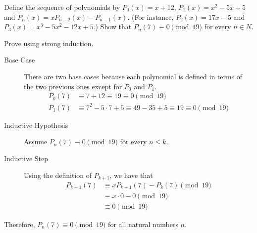 \question Define the sequence of polynomials by $P_0(x) = x + 12$, 
$P_1(x) = x^2 - 5x + 5$ and $P_n(x) = xP_{n-2}(x) - P_{n-1}(x)$. 
(For instance, $P_2(x) = 17x-5$ and $P_3(x) = x^3 -5x^2 -12x+5$.) 
Show that $P_n(7) \equiv 0 \pmod{19}$ for every $n \in N$. 
\begin{solution}[.8in]

\item Prove using strong induction.
\begin{description}
\item[Base Case] There are two base cases because each polynomial is 
defined in terms of the two previous ones except for $P_0$ and $P_1$.
\begin{equation}
\begin{split}
P_0(7) &\equiv 7 + 12 \equiv 19 \equiv 0 \pmod{19} \\ \nonumber
P_1(7) &\equiv 7^2 - 5\cdot 7 + 5 \equiv 49 - 35 + 5 \equiv 19 \equiv 
0 \pmod{19}
\end{split}
\end{equation}
\item[Inductive Hypothesis] Assume $P_n(7) \equiv 0 \pmod{19}$ for 
every $n \leq k$.
\item [Inductive Step] Using the definition of $P_{k+1}$, we have that 
\begin{equation}
\begin{split}
P_{k+1}(7) &\equiv xP_{k-1}(7) - P_k(7) \pmod{19} \\ \nonumber
&\equiv x \cdot 0 - 0 \pmod{19} \\
&\equiv 0 \pmod{19}
\end{split}
\end{equation}
\end{description}
Therefore, $P_n(7) \equiv 0 \pmod{19}$ for all natural numbers $n$.
\end{solution}

